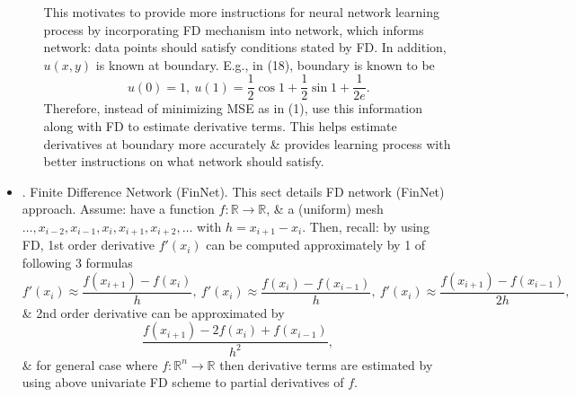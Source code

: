 \documentclass{article}
\begin{document}
\begin{itemize}
\begin{itemize}
		This motivates to provide more instructions for neural network learning process by incorporating FD mechanism into network, which informs network: data points should satisfy conditions stated by FD. In addition, $u(x,y)$ is known at boundary. E.g., in (18), boundary is known to be
		\begin{equation*}
			u(0) = 1,\ u(1) = \frac{1}{2}\cos1 + \frac{1}{2}\sin1 + \frac{1}{2e}.
		\end{equation*}
		Therefore, instead of minimizing MSE as in (1), use this information along with FD to estimate derivative terms. This helps estimate derivatives at boundary more accurately \& provides learning process with better instructions on what network should satisfy.
	\end{itemize}
	\item {. Finite Difference Network (FinNet).} This sect details FD network (FinNet) approach. Assume: have a function $f:\mathbb{R}\to\mathbb{R}$, \& a (uniform) mesh $\ldots,x_{i-2},x_{i-1},x_i,x_{i+1},x_{i+2},\ldots$ with $h = x_{i+1} - x_i$. Then, recall: by using FD, 1st order derivative $f'(x_i)$ can be computed approximately by 1 of following 3 formulas
	\begin{equation*}
		f'(x_i)\approx\frac{f(x_{i+1}) - f(x_i)}{h},\ f'(x_i)\approx\frac{f(x_i) - f(x_{i-1})}{h},\ f'(x_i)\approx\frac{f(x_{i+1}) - f(x_{i-1})}{2h}, 
	\end{equation*}
	\& 2nd order derivative can be approximated by
	\begin{equation*}
		\frac{f(x_{i+1}) - 2f(x_i) + f(x_{i-1})}{h^2},
	\end{equation*}
	\& for general case where $f:\mathbb{R}^n\to\mathbb{R}$ then derivative terms are estimated by using above univariate FD scheme to partial derivatives of $f$.
	

\end{itemize}
\end{document}
